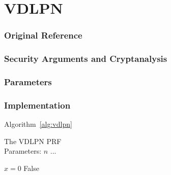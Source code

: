 \section{VDLPN}
\label{sec:vdlpn}


\subsubsection*{Original Reference}

\subsubsection*{Security Arguments and Cryptanalysis}


\subsubsection*{Parameters}


\subsubsection*{Implementation}

Algorithm~\ref{alg:vdlpn}

\begin{algorithm}
  \caption{\label{alg:vdlpn}The VDLPN PRF \\
    Parameters: $n$ ...}
  \begin{algorithmic}
    \State $x = 0$
    \Return False
  \end{algorithmic}
\end{algorithm}





